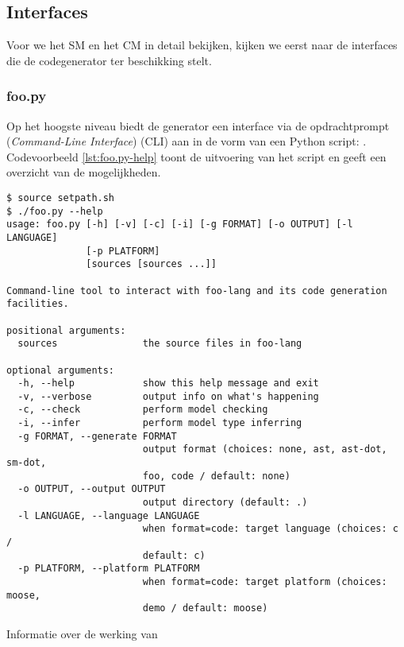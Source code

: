 
\subsection{Interfaces}
\label{subsection:devel-codegen-interfaces}

Voor we het SM en het CM in detail bekijken, kijken we eerst naar de interfaces
die de codegenerator ter beschikking stelt.

\subsubsection{foo.py}

Op het hoogste niveau biedt de generator een interface via de opdrachtprompt
(\emph{Command-Line Interface}) (CLI) aan in de vorm van een Python script:
. Codevoorbeeld \ref{lst:foo.py-help} toont de uitvoering van het
script en geeft een overzicht van de mogelijkheden.

\begin{listing}[ht]
  \begin{verbatim}
$ source setpath.sh
$ ./foo.py --help
usage: foo.py [-h] [-v] [-c] [-i] [-g FORMAT] [-o OUTPUT] [-l LANGUAGE]
              [-p PLATFORM]
              [sources [sources ...]]

Command-line tool to interact with foo-lang and its code generation
facilities.

positional arguments:
  sources               the source files in foo-lang

optional arguments:
  -h, --help            show this help message and exit
  -v, --verbose         output info on what's happening
  -c, --check           perform model checking
  -i, --infer           perform model type inferring
  -g FORMAT, --generate FORMAT
                        output format (choices: none, ast, ast-dot, sm-dot,
                        foo, code / default: none)
  -o OUTPUT, --output OUTPUT
                        output directory (default: .)
  -l LANGUAGE, --language LANGUAGE
                        when format=code: target language (choices: c /
                        default: c)
  -p PLATFORM, --platform PLATFORM
                        when format=code: target platform (choices: moose,
                        demo / default: moose)
  \end{verbatim}
  \vspace{-5mm}
  \caption{Informatie over de werking van }
  \label{lst:foo.py-help}
\end{listing}

